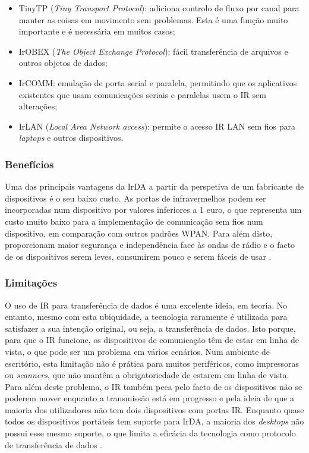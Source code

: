 \documentclass[conference]{IEEEtran}
\begin{document}
\begin{itemize}

 \item TinyTP (\textit{Tiny Transport Protocol}): adiciona controlo de fluxo por canal para manter as coisas em movimento sem problemas. Esta é uma função muito importante e é necessária em muitos casos;
 \item IrOBEX (\textit{The Object Exchange Protocol}): fácil transferência de arquivos e outros objetos de dados;
 \item IrCOMM: emulação de porta serial e paralela, permitindo que os aplicativos existentes que usam comunicações seriais e paralelas usem o IR sem alterações;
 \item IrLAN (\textit{Local Area Network access}): permite o acesso IR LAN sem fios para \textit{laptops} e outros dispositivos.

\end{itemize}



\subsubsection{Benefícios}

Uma das principais vantagens da IrDA a partir da perspetiva de um fabricante de dispositivos é o seu baixo custo. 
As portas de infravermelhos podem ser incorporadas num dispositivo por valores inferiores a 1 euro, o que representa um custo muito baixo para a implementação de comunicação sem fios num dispositivo, em comparação com outros padrões WPAN. 
Para além disto, proporcionam maior segurança e independência face às ondas de rádio e o facto de os dispositivos serem leves, consumirem pouco e serem fáceis de usar \cite{infaredadvdis}.


\subsubsection{Limitações}

O uso de IR para transferência de dados é uma excelente ideia, em teoria. 
No entanto, mesmo com esta ubiquidade, a tecnologia raramente é utilizada para satisfazer a sua intenção original, ou seja, a transferência de dados. 
Isto porque, para que o IR funcione, os dispositivos de comunicação têm de estar em linha de vista, o que pode ser um problema em vários cenários. 
Num ambiente de escritório, esta limitação não é prática para muitos periféricos, como impressoras ou \textit{scanners}, que não mantêm a obrigatoriedade de estarem em linha de vista. 
Para além deste problema, o IR também peca pelo facto de os dispositivos não se poderem mover enquanto a transmissão está em progresso e pela ideia de que a maioria dos utilizadores não tem dois dispositivos com portas IR. 
Enquanto quase todos os dispositivos portáteis tem suporte para IrDA, a maioria dos \textit{desktops} não possui esse mesmo suporte, o que limita a eficácia da tecnologia como protocolo de transferência de dados \cite{wpanonline}.
\end{document}
